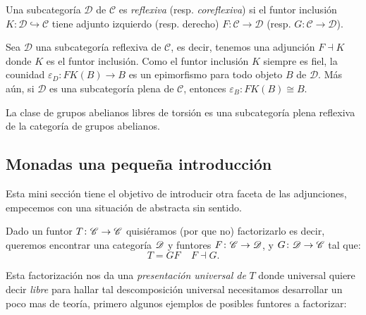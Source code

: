 \documentclass{comunicaciones}
\begin{document}
\begin{dfn}
	Una subcategor\'ia $\mathcal{D}$ de $\mathcal{C}$ es \emph{reflexiva} (resp. \emph{coreflexiva}) si el funtor inclusi\'on $K:\mathcal{D}\hookrightarrow \mathcal{C}$ tiene adjunto izquierdo (resp. derecho) $F:\mathcal{C}\to \mathcal{D}$ (resp. $G:\mathcal{C}\to \mathcal{D}$).
\end{dfn}

Sea $\mathcal{D}$ una subcategor\'ia reflexiva de $\mathcal{C}$, es decir, tenemos una adjunci\'on $F\dashv K$ donde $K$ es el funtor inclusi\'on. Como el funtor inclusi\'on $K$ siempre es fiel, la counidad $\varepsilon_D:FK(B)\to B$ es un epimorfismo para todo objeto $B$ de $\mathcal{D}$. M\'as a\'un, si $\mathcal{D}$ es una subcategor\'ia plena de $\mathcal{C}$, entonces $\varepsilon_B:FK(B)\cong B$.

\begin{ej}
	La clase de grupos abelianos libres de torsi\'on es una subcategor\'ia plena reflexiva de la categor\'ia de grupos abelianos.
\end{ej}

\subsection[Monadas una pequeña introducción]{Monadas una pequeña introducción}\label{SECMON}


Esta mini sección tiene el objetivo de introducir otra faceta de las adjunciones, empecemos con una situación de abstracta sin sentido.


Dado un funtor $T\colon \EuScript{C}\rightarrow\EuScript{C}$ quisiéramos (por que no) factorizarlo es decir, queremos encontrar una categoría $\D$ y funtores $F\colon \C\rightarrow\D$,
y $G\colon \D\rightarrow \C$ tal que: \[T=GF\;\;\;\; F\dashv G.\]

Esta factorización nos da una \emph{presentación universal de } $T$ donde universal quiere decir \emph{libre}
para hallar tal descomposición universal necesitamos desarrollar un poco mas de teoría, primero algunos ejemplos de posibles funtores a factorizar:
\end{document}

